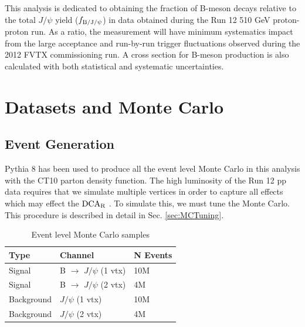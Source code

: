 \documentclass[12pt]{article}
\newcommand{\jpsi}{$J/\psi$ }
\newcommand{\dcar}{$\rm{DCA}_{R}$ }
\begin{document}
This analysis is dedicated to obtaining the fraction of B-meson decays relative to the total \jpsi yield ($f_{\rm B/J/\psi}$) in data obtained during the Run 12 510 GeV proton-proton run.
 As a ratio, the measurement will have minimum systematics impact from the large acceptance and run-by-run trigger fluctuations observed during the 2012 FVTX commissioning run.  
 A cross section for B-meson production is also calculated with both statistical and systematic uncertainties. 


\section{Datasets and Monte Carlo}
\label{sec:Datasets}

\subsection{Event Generation}
\label{sec:EventGen}

Pythia 8 has been used to produce all the event level Monte Carlo in this analysis with the CT10 \cite{ref:CT10} parton density function.  
The high luminosity of the Run 12 pp data requires that we simulate multiple vertices in order to capture all effects which may effect
the \dcar.  To simulate this, we must tune the Monte Carlo.  This procedure is described in detail in Sec. \ref{sec:MCTuning}.


\begin{table}[h]
\centering
\caption{Event level Monte Carlo samples}
\begin{tabular}{| l | l | l |}\hline

Type        &    Channel       &    N Events \\ \hline \hline
Signal      &   B $\to$ \jpsi (1 vtx)        &    10M        \\  
Signal      &   B $\to$ \jpsi (2 vtx)        &    4M        \\  
Background   &   \jpsi (1 vtx)       &    10M        \\  
Background   &   \jpsi (2 vtx)       &    4M        \\  \hline

\end{tabular}
\label{tab:EventGen}
\end{table}

\end{document}
